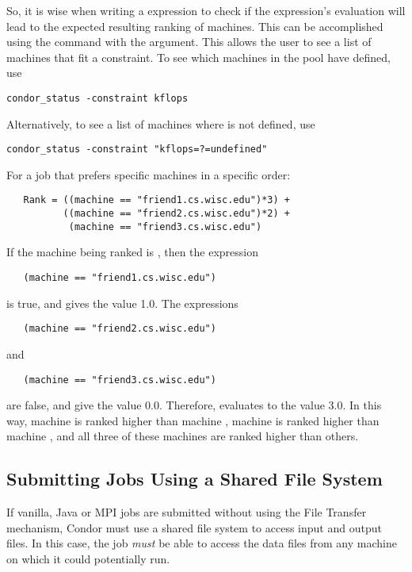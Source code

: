 So, it is wise when writing a  expression to check
if the expression's evaluation will lead to the expected
resulting ranking of machines.
This can be accomplished using the  command with the
 argument.  This allows the user to see a list of
machines that fit a constraint.
To see which machines in the pool have  defined,
use
\begin{verbatim}
condor_status -constraint kflops
\end{verbatim}
Alternatively, to see a list of machines where 
 is not defined, use
\begin{verbatim}
condor_status -constraint "kflops=?=undefined"
\end{verbatim}

For a job that prefers specific machines in a specific order:
\begin{verbatim}
   Rank = ((machine == "friend1.cs.wisc.edu")*3) +
          ((machine == "friend2.cs.wisc.edu")*2) +
           (machine == "friend3.cs.wisc.edu")
\end{verbatim}
If the machine being ranked is , then the
expression
\begin{verbatim}
   (machine == "friend1.cs.wisc.edu")
\end{verbatim}
is true, and gives the value 1.0.
The expressions
\begin{verbatim}
   (machine == "friend2.cs.wisc.edu")
\end{verbatim}
and
\begin{verbatim}
   (machine == "friend3.cs.wisc.edu")
\end{verbatim}
are false, and give the value 0.0.
Therefore,  evaluates to the value 3.0.
In this way, machine  is ranked higher than
machine ,
machine 
is ranked higher than 
machine ,
and all three of these machines are ranked higher than others.

\subsection{\label{sec:shared-fs}
Submitting Jobs Using a Shared File System} 

If vanilla, Java or MPI
jobs are submitted without using the File Transfer mechanism, 
Condor must use a shared file system to access input and output
files. 
In this case, the job \emph{must} be able to access the data files
from any machine on which it could potentially run.

